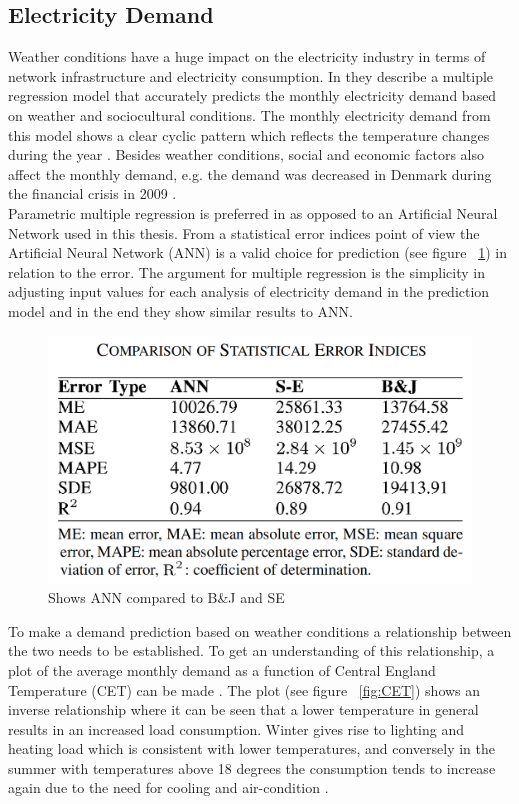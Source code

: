 \documentclass[twoside,11pt,openright]{report}
\begin{document}
\subsection{Electricity Demand}
Weather conditions have a huge impact on the electricity industry in terms of network infrastructure and electricity consumption. In \cite{19} they describe a multiple regression model that accurately predicts the monthly electricity demand based on weather and sociocultural conditions. The monthly electricity demand from this model shows a clear cyclic pattern which reflects the temperature changes during the year \cite{19}. Besides weather conditions, social and economic factors also affect the monthly demand, e.g. the demand was decreased in Denmark during the financial crisis in 2009 \cite{20}. 
\\[0.5cm]
Parametric multiple regression is preferred in \cite{19} as opposed to an Artificial Neural Network used in this thesis. From a statistical error indices point of view the Artificial Neural Network (ANN) is a valid choice for prediction (see figure ~\ref{fig:anncomparison}) in relation to the error. The argument for multiple regression is the simplicity in adjusting input values for each analysis of electricity demand in the prediction model and in the end they show similar results to ANN. 
\begin{figure}[h!]
\centering
\includegraphics[width=0.8\linewidth,natwidth=898,natheight=587]{billeder/StatisticalErrorOfNeuralNetworksAndRegression.png}
\caption{Shows ANN compared to B\&J and SE \cite{19} }
\label{fig:anncomparison}
\end{figure}
To make a demand prediction based on weather conditions a relationship between the two needs to be established. To get an understanding of this relationship, a plot of the average monthly demand as a function of Central England Temperature (CET) can be made \cite{19}. The plot (see figure ~\ref{fig:CET}) shows an inverse relationship where it can be seen that a lower temperature in general results in an increased load consumption. Winter gives rise to lighting and heating load which is consistent with lower temperatures, and conversely in the summer with temperatures above 18 degrees the consumption tends to increase again due to the need for cooling and air-condition \cite{19}.
\end{document}
